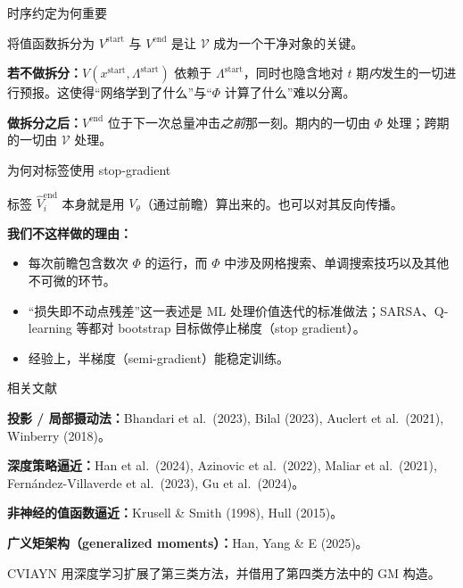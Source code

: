 \documentclass[10pt,aspectratio=169]{beamer}
\newcommand{\Vstart}{V^{\mathrm{start}}}
\newcommand{\Vend}{V^{\mathrm{end}}}
\newcommand{\Lstart}{\Lambda^{\mathrm{start}}}
\newcommand{\xstart}{x^{\mathrm{start}}}
\newcommand{\CV}{\mathcal{V}}
\begin{document}
\begin{frame}{时序约定为何重要}

将值函数拆分为 $\Vstart$ 与 $\Vend$ 是让 $\CV$ 成为一个干净对象的关键。

\smallskip

\textbf{若不做拆分：}$V(\xstart, \Lstart)$ 依赖于 $\Lstart$，同时也隐含地对 $t$ 期\emph{内}发生的一切进行预报。这使得“网络学到了什么”与“$\Phi$ 计算了什么”难以分离。

\smallskip

\textbf{做拆分之后：}$\Vend$ 位于下一次总量冲击\emph{之前}那一刻。期内的一切由 $\Phi$ 处理；跨期的一切由 $\CV$ 处理。

\end{frame}

\begin{frame}{为何对标签使用 stop-gradient}

标签 $\widehat\Vend_i$ 本身就是用 $V_\theta$（通过前瞻）算出来的。也可以对其反向传播。

\smallskip

\textbf{我们不这样做的理由：}

\begin{itemize}
  \item 每次前瞻包含数次 $\Phi$ 的运行，而 $\Phi$ 中涉及网格搜索、单调搜索技巧以及其他不可微的环节。
  \item “损失即不动点残差”这一表述是 ML 处理价值迭代的标准做法；SARSA、Q-learning 等都对 bootstrap 目标做停止梯度（stop gradient）。
  \item 经验上，半梯度（semi-gradient）能稳定训练。
\end{itemize}

\end{frame}

\begin{frame}{相关文献}

\textbf{投影 / 局部摄动法：}Bhandari et al.\ (2023), Bilal (2023), Auclert et al.\ (2021), Winberry (2018)。

\smallskip

\textbf{深度策略逼近：}Han et al.\ (2024), Azinovic et al.\ (2022), Maliar et al.\ (2021), Fern\'andez-Villaverde et al.\ (2023), Gu et al.\ (2024)。

\smallskip

\textbf{非神经的值函数逼近：}Krusell \& Smith (1998), Hull (2015)。

\smallskip

\textbf{广义矩架构（generalized moments）：}Han, Yang \& E (2025)。

\smallskip

CVIAYN 用深度学习扩展了第三类方法，并借用了第四类方法中的 GM 构造。

\end{frame}
\end{document}
